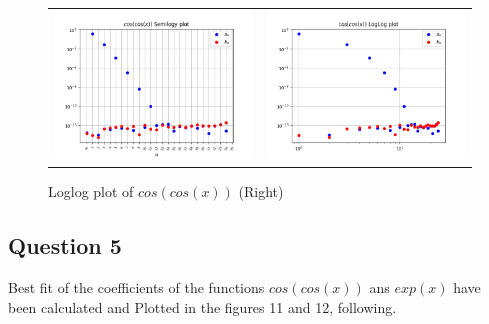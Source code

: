 \documentclass[11pt, a4paper]{article}
\begin{document}
             \begin{figure}[H]
                    \centering
                    \setlength\tabcolsep{2pt}
                    \begin{tabular}{cc}
                       \includegraphics[scale=0.5]{Figure 5.png} &
                       \includegraphics[scale=0.5]{Figure 6.png}
                    \end{tabular}
                    \caption{Semilog Plot of $cos(cos(x))$ (Left)} \caption{Loglog plot of $cos(cos(x))$ (Right)}
                \end{figure}
                
	   \subsection{Question 5}
           Best fit of the coefficients of the functions $cos(cos(x))$ ans $exp(x)$ have been calculated and Plotted in the figures 11 and 12, following.            
\end{document}

